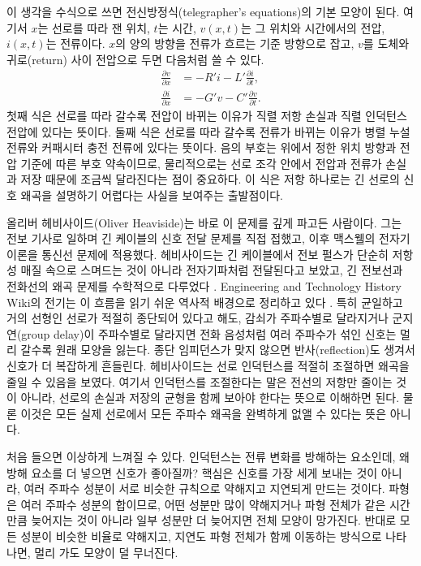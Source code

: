 이 생각을 수식으로 쓰면 전신방정식(telegrapher's equations)의 기본 모양이 된다.
여기서 $x$는 선로를 따라 잰 위치, $t$는 시간, $v(x,t)$는 그 위치와 시간에서의 전압, $i(x,t)$는 전류이다.
$x$의 양의 방향을 전류가 흐르는 기준 방향으로 잡고, $v$를 도체와 귀로(return) 사이 전압으로 두면 다음처럼 쓸 수 있다.
\begin{align}
  \frac{\partial v}{\partial x} &= -R'i - L'\frac{\partial i}{\partial t}, \\
  \frac{\partial i}{\partial x} &= -G'v - C'\frac{\partial v}{\partial t}.
\end{align}
첫째 식은 선로를 따라 갈수록 전압이 바뀌는 이유가 직렬 저항 손실과 직렬 인덕턴스 전압에 있다는 뜻이다.
둘째 식은 선로를 따라 갈수록 전류가 바뀌는 이유가 병렬 누설 전류와 커패시터 충전 전류에 있다는 뜻이다.
음의 부호는 위에서 정한 위치 방향과 전압 기준에 따른 부호 약속이므로, 물리적으로는 선로 조각 안에서 전압과 전류가 손실과 저장 때문에 조금씩 달라진다는 점이 중요하다.
이 식은 저항 하나로는 긴 선로의 신호 왜곡을 설명하기 어렵다는 사실을 보여주는 출발점이다.

올리버 헤비사이드(Oliver Heaviside)는 바로 이 문제를 깊게 파고든 사람이다.
그는 전보 기사로 일하며 긴 케이블의 신호 전달 문제를 직접 접했고, 이후 맥스웰의 전자기 이론을 통신선 문제에 적용했다.
헤비사이드는 긴 케이블에서 전보 펄스가 단순히 저항성 매질 속으로 스며드는 것이 아니라 전자기파처럼 전달된다고 보았고, 긴 전보선과 전화선의 왜곡 문제를 수학적으로 다루었다 \cite{heaviside_electrical_papers,donaghyspargo2018heaviside}.
Engineering and Technology History Wiki의 전기는 이 흐름을 읽기 쉬운 역사적 배경으로 정리하고 있다 \cite{ethw_heaviside}.
특히 균일하고 거의 선형인 선로가 적절히 종단되어 있다고 해도, 감쇠가 주파수별로 달라지거나 군지연(group delay)이 주파수별로 달라지면 전화 음성처럼 여러 주파수가 섞인 신호는 멀리 갈수록 원래 모양을 잃는다.
종단 임피던스가 맞지 않으면 반사(reflection)도 생겨서 신호가 더 복잡하게 흔들린다.
헤비사이드는 선로 인덕턴스를 적절히 조절하면 왜곡을 줄일 수 있음을 보였다.
여기서 인덕턴스를 조절한다는 말은 전선의 저항만 줄이는 것이 아니라, 선로의 손실과 저장의 균형을 함께 보아야 한다는 뜻으로 이해하면 된다.
물론 이것은 모든 실제 선로에서 모든 주파수 왜곡을 완벽하게 없앨 수 있다는 뜻은 아니다.

처음 들으면 이상하게 느껴질 수 있다.
인덕턴스는 전류 변화를 방해하는 요소인데, 왜 방해 요소를 더 넣으면 신호가 좋아질까?
핵심은 신호를 가장 세게 보내는 것이 아니라, 여러 주파수 성분이 서로 비슷한 규칙으로 약해지고 지연되게 만드는 것이다.
파형은 여러 주파수 성분의 합이므로, 어떤 성분만 많이 약해지거나 파형 전체가 같은 시간만큼 늦어지는 것이 아니라 일부 성분만 더 늦어지면 전체 모양이 망가진다.
반대로 모든 성분이 비슷한 비율로 약해지고, 지연도 파형 전체가 함께 이동하는 방식으로 나타나면, 멀리 가도 모양이 덜 무너진다.

